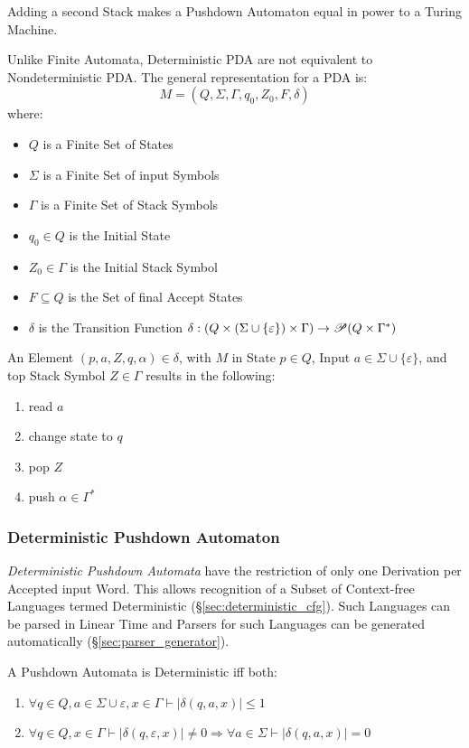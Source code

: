 Adding a second Stack makes a Pushdown Automaton equal in power to a
Turing Machine.

Unlike Finite Automata, Deterministic PDA are not equivalent to
Nondeterministic PDA. The general representation for a PDA is:
\[
  M = (Q, \Sigma, \Gamma, q_0, Z_0, F, \delta)
\]
where:
\begin{itemize}
  \item $Q$ is a Finite Set of States
  \item $\Sigma$ is a Finite Set of input Symbols
  \item $\Gamma$ is a Finite Set of Stack Symbols
  \item $q_0 \in Q$ is the Initial State
  \item $Z_0 \in \Gamma$ is the Initial Stack Symbol
  \item $F \subseteq Q$ is the Set of final Accept States
  \item $\delta$ is the Transition Function $\delta: (Q \times (\Sigma
    \cup \{\varepsilon\}) \times \Gamma) \rightarrow \mathscr{P}(Q \times
    \Gamma^*)$
\end{itemize}

An Element $(p,a,Z,q,\alpha)\in\delta$, with $M$ in State $p \in Q$,
Input $a \in \Sigma \cup \{\varepsilon\}$, and top Stack Symbol $Z \in
\Gamma$ results in the following:
\begin{enumerate}
  \item read $a$
  \item change state to $q$
  \item pop $Z$
  \item push $\alpha \in \Gamma^*$
\end{enumerate}



\subsubsection{Deterministic Pushdown Automaton}
\label{sec:deterministic_pda}

\emph{Deterministic Pushdown Automata} have the restriction of only
one Derivation per Accepted input Word. This allows recognition of a
Subset of Context-free Languages termed Deterministic
(\S\ref{sec:deterministic_cfg}). Such Languages can be parsed in
Linear Time and Parsers for such Languages can be generated
automatically (\S\ref{sec:parser_generator}).

A Pushdown Automata is Deterministic iff both:
\begin{enumerate}
\item $\forall q \in Q, a \in \Sigma \cup {\varepsilon}, x \in
  \Gamma \vdash |\delta(q,a,x)| \leq 1$
\item $\forall q \in Q, x \in \Gamma \vdash |\delta(q,\varepsilon,x)|
  \neq 0 \Rightarrow \forall a \in \Sigma \vdash |\delta(q,a,x)|=0$
\end{enumerate}



